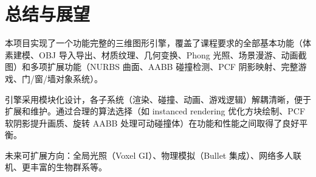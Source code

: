 \documentclass{article}
\begin{document}
\section{总结与展望}

本项目实现了一个功能完整的三维图形引擎，覆盖了课程要求的全部基本功能（体素建模、OBJ 导入导出、材质纹理、几何变换、Phong 光照、场景漫游、动画截图）和多项扩展功能（NURBS 曲面、AABB 碰撞检测、PCF 阴影映射、完整游戏、门/窗/墙对象系统）。

引擎采用模块化设计，各子系统（渲染、碰撞、动画、游戏逻辑）解耦清晰，便于扩展和维护。通过合理的算法选择（如 instanced rendering 优化方块绘制、PCF 软阴影提升画质、旋转 AABB 处理可动碰撞体）在功能和性能之间取得了良好平衡。

未来可扩展方向：全局光照（Voxel GI）、物理模拟（Bullet 集成）、网络多人联机、更丰富的生物群系等。
\end{document}
